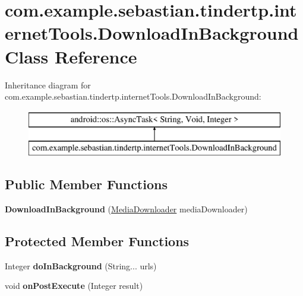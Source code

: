 \hypertarget{classcom_1_1example_1_1sebastian_1_1tindertp_1_1internetTools_1_1DownloadInBackground}{}\section{com.\+example.\+sebastian.\+tindertp.\+internet\+Tools.\+Download\+In\+Background Class Reference}
\label{classcom_1_1example_1_1sebastian_1_1tindertp_1_1internetTools_1_1DownloadInBackground}
Inheritance diagram for com.\+example.\+sebastian.\+tindertp.\+internet\+Tools.\+Download\+In\+Background\+:\begin{figure}[H]
\begin{center}
\leavevmode
\includegraphics[height=2.000000cm]{classcom_1_1example_1_1sebastian_1_1tindertp_1_1internetTools_1_1DownloadInBackground}
\end{center}
\end{figure}
\subsection*{Public Member Functions}
\begin{DoxyCompactItemize}
\item 
{\bfseries Download\+In\+Background} (\hyperlink{classcom_1_1example_1_1sebastian_1_1tindertp_1_1internetTools_1_1MediaDownloader}{Media\+Downloader} media\+Downloader)\hypertarget{classcom_1_1example_1_1sebastian_1_1tindertp_1_1internetTools_1_1DownloadInBackground_ac9efa075b5917ecbf87ca23bfeddc9ef}{}\label{classcom_1_1example_1_1sebastian_1_1tindertp_1_1internetTools_1_1DownloadInBackground_ac9efa075b5917ecbf87ca23bfeddc9ef}

\end{DoxyCompactItemize}
\subsection*{Protected Member Functions}
\begin{DoxyCompactItemize}
\item 
Integer {\bfseries do\+In\+Background} (String... urls)\hypertarget{classcom_1_1example_1_1sebastian_1_1tindertp_1_1internetTools_1_1DownloadInBackground_aa83aa459e539fded062da68c9dc7552b}{}\label{classcom_1_1example_1_1sebastian_1_1tindertp_1_1internetTools_1_1DownloadInBackground_aa83aa459e539fded062da68c9dc7552b}

\item 
void {\bfseries on\+Post\+Execute} (Integer result)\hypertarget{classcom_1_1example_1_1sebastian_1_1tindertp_1_1internetTools_1_1DownloadInBackground_a2d8d463b091a67d013f02ba410d361c0}{}\label{classcom_1_1example_1_1sebastian_1_1tindertp_1_1internetTools_1_1DownloadInBackground_a2d8d463b091a67d013f02ba410d361c0}

\end{DoxyCompactItemize}


